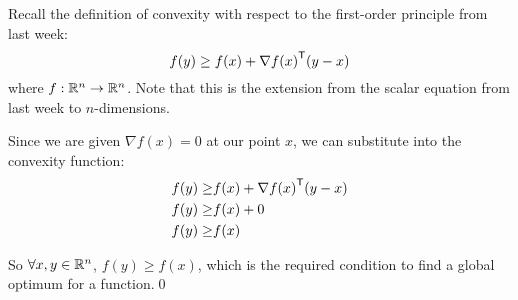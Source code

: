 Recall the definition of convexity with respect to the first-order principle from last week:
\begin{equation*}
  f(y) \geq f(x) + {\nabla f(x)}^{\mathsf{T}}(y-x)
\end{equation*}
where $f:\mathbb{R}^n\to\mathbb{R}^n$. Note that this is the extension from the scalar equation from last week to $n$-dimensions.

Since we are given $\nabla f(x)=0$ at our point $x$, we can substitute into the convexity function:
\begin{align*}
  f(y) \geq& f(x) + {\nabla f(x)}^{\mathsf{T}}(y-x) \\
  f(y) \geq& f(x) + 0 \\
  f(y) \geq& f(x)
\end{align*}

So $\forall x, y \in \mathbb{R}^n$, $f(y) \geq f(x)$, which is the required condition to find a global optimum for a function.\qed
